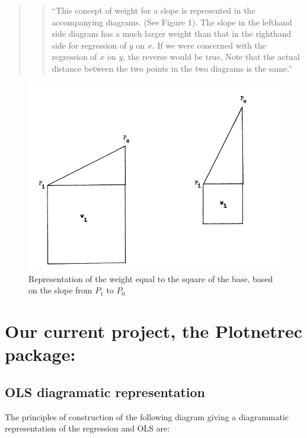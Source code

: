 \documentclass[
]{report}
\begin{document}
\begin{quote}
\begin{quote}
``This concept of weight for a slope is represented in the accompanying diagrams. (See Figure 1). The slope in the lefthand side diagram has a much larger weight than that in the righthand side for regression of \(y\) on \(x\). If we were concerned with the regression of \(x\) on \(y\), the reverse would be true. Note that the actual distance between the two points in the two diagrams is the same.''
\end{quote}
\end{quote}

\begin{figure}
    \centering
    \includegraphics[width= 250 pt]{LI_slope.PNG}
    \caption{Representation of the weight equal to the square of the base, based on the slope from $P_1$ to $P_0$}
\end{figure}

\hypertarget{our-current-project-the-plotnetrec-package}{%
\section{Our current project, the Plotnetrec package:}\label{our-current-project-the-plotnetrec-package}}

\hypertarget{ols-diagramatic-representation}{%
\subsection{OLS diagramatic representation}\label{ols-diagramatic-representation}}

The principles of construction of the following diagram giving a diagrammatic representation of the regression and OLS are:
\end{document}
